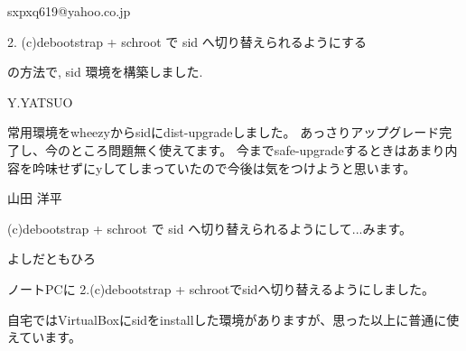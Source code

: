 \documentclass[mingoth,a4paper]{jsarticle}
\begin{document}
\begin{prework}{ sxpxq619@yahoo.co.jp }

2. (c)debootstrap + schroot で sid へ切り替えられるようにする

の方法で, sid 環境を構築しました.

\end{prework}

\begin{prework}{ Y.YATSUO }

常用環境をwheezyからsidにdist-upgradeしました。
あっさりアップグレード完了し、今のところ問題無く使えてます。
今までsafe-upgradeするときはあまり内容を吟味せずにyしてしまっていたので今後は気をつけようと思います。

\end{prework}

\begin{prework}{ 山田 洋平 }

(c)debootstrap + schroot で sid へ切り替えられるようにして...みます。

\end{prework}

\begin{prework}{ よしだともひろ }

ノートPCに 2.(c)debootstrap + schrootでsidへ切り替えるようにしました。

自宅ではVirtualBoxにsidをinstallした環境がありますが、思った以上に普通に使えています。
\end{prework}
\end{document}
